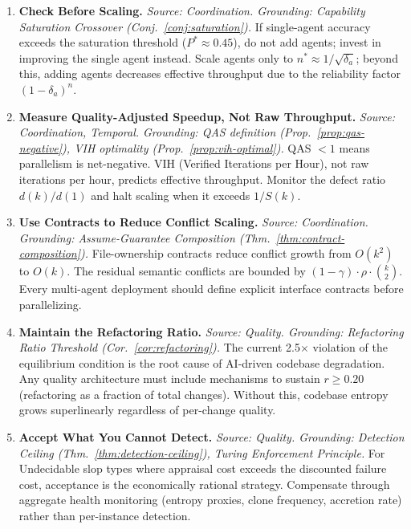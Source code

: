 \documentclass[11pt, a4paper, logo, copyright]{googledeepmind}
\begin{document}
\begin{enumerate}[label=\textbf{P\arabic*.}, leftmargin=3em, resume]
\item \textbf{Check Before Scaling.}
\emph{Source: Coordination. Grounding: Capability Saturation Crossover (Conj.~\ref{conj:saturation}).}
If single-agent accuracy exceeds the saturation threshold ($P^* \approx 0.45$), do not add agents; invest in improving the single agent instead. Scale agents only to $n^* \approx 1/\sqrt{\delta_a}$; beyond this, adding agents decreases effective throughput due to the reliability factor $(1-\delta_a)^n$.

\item \textbf{Measure Quality-Adjusted Speedup, Not Raw Throughput.}
\emph{Source: Coordination, Temporal. Grounding: QAS definition (Prop.~\ref{prop:qas-negative}), VIH optimality (Prop.~\ref{prop:vih-optimal}).}
QAS $< 1$ means parallelism is net-negative. VIH (Verified Iterations per Hour), not raw iterations per hour, predicts effective throughput. Monitor the defect ratio $d(k)/d(1)$ and halt scaling when it exceeds $1/S(k)$.

\item \textbf{Use Contracts to Reduce Conflict Scaling.}
\emph{Source: Coordination. Grounding: Assume-Guarantee Composition (Thm.~\ref{thm:contract-composition}).}
File-ownership contracts reduce conflict growth from $O(k^2)$ to $O(k)$. The residual semantic conflicts are bounded by $(1-\gamma) \cdot \rho \cdot \binom{k}{2}$. Every multi-agent deployment should define explicit interface contracts before parallelizing.

\item \textbf{Maintain the Refactoring Ratio.}
\emph{Source: Quality. Grounding: Refactoring Ratio Threshold (Cor.~\ref{cor:refactoring}).}
The current 2.5$\times$ violation of the equilibrium condition is the root cause of AI-driven codebase degradation. Any quality architecture must include mechanisms to sustain $r \geq 0.20$ (refactoring as a fraction of total changes). Without this, codebase entropy grows superlinearly regardless of per-change quality.

\item \textbf{Accept What You Cannot Detect.}
\emph{Source: Quality. Grounding: Detection Ceiling (Thm.~\ref{thm:detection-ceiling}), Turing Enforcement Principle.}
For Undecidable slop types where appraisal cost exceeds the discounted failure cost, acceptance is the economically rational strategy. Compensate through aggregate health monitoring (entropy proxies, clone frequency, accretion rate) rather than per-instance detection.


\end{enumerate}
\end{document}

